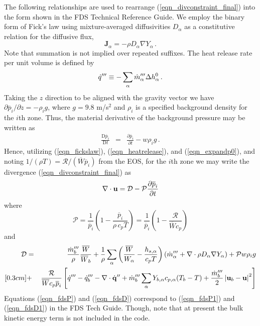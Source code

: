 The following relationships are used to rearrange (\ref{eqn_divconstraint_final}) into
the form shown in the FDS Technical Reference Guide. We employ the binary form of Fick's law using mixture-averaged diffusivities $D_\alpha$ as a constitutive relation for the diffusive flux,
\begin{equation}
\label{eqn_fickslaw}
\mathbf{J}_{\alpha} = - \rho D_\alpha \nabla Y_\alpha \,\mbox{.}
\end{equation}
Note that summation is not implied over repeated suffixes.
The heat release rate per unit volume is defined by
\begin{equation}
\label{eqn_heatrelease}
\dot{q}^{\prime\prime\prime} \equiv -\sum_\alpha \dot{m}_{\alpha}^{\prime\prime\prime} \Delta h^0_\alpha \,\mbox{.}
\end{equation}
Taking the $z$ direction to be aligned with the gravity vector we have $\partial \overline{p}_i/\partial z = -\rho_i g$,
where $g = 9.8$ m/s$^2$ and $\rho_i$ is a specified background density for the $i$th zone.
Thus, the material derivative of the background pressure may be written as
\begin{eqnarray}
\label{eqn_expandp0}
\frac{\mbox{D}\overline{p}_i}{\mbox{D}t} &=& \frac{\partial \overline{p}_i}{\partial t} - w \rho_i g \,\mbox{.}
\end{eqnarray}
Hence, utilizing (\ref{eqn_fickslaw}), (\ref{eqn_heatrelease}), and (\ref{eqn_expandp0}), and noting $1/(\rho T) = \mathcal{R}/(\overline{W} \overline{p}_i)$ from the EOS,
for the $i$th zone we may write the divergence (\ref{eqn_divconstraint_final}) as
\begin{equation}
\label{eqn_fds_divcontraint}
\nabla\cdot \mathbf{u} = \mathcal{D} - \mathcal{P} \frac{\partial \overline{p}_i}{\partial t}
\end{equation}
where
\begin{equation}
\label{eqn_fdsP}
\mathcal{P} = \frac{1}{\overline{p}_i}\left( 1 - \frac{\overline{p}_i}{\rho \,c_p T} \right) = \frac{1}{\overline{p}_i}\left( 1 - \frac{\mathcal{R}}{\overline{W} c_p}  \right)
\end{equation}
and
\begin{eqnarray}
\label{eqn_fdsD}
\mathcal{D} &=& \frac{\dot{m}_b^{\prime\prime\prime}}{\rho}\frac{\overline{W}}{\overline{W}_b} +
                \frac{1}{\rho}\sum_\alpha \left( \frac{\overline{W}}{W_\alpha} - \frac{h_{s,\alpha}}{c_p T} \right) \left( \dot{m}_{\alpha}^{\prime\prime\prime} + \nabla\cdot \rho D_\alpha \nabla Y_\alpha \right) +
                \mathcal{P} w \rho_i g \nonumber  \\ [0.3cm]
&+& \frac{\mathcal{R}}{\overline{W} c_p \overline{p}_i} \left[ \dot{q}^{\prime\prime\prime} - \dot{q}_b''' - \nabla\cdot \dot{\mathbf{q}}^{\prime\prime} + 
                \dot{m}_{b}^{{\prime\prime\prime}} \sum_\alpha Y_{b,\alpha} c_{p,\alpha}(T_b-T) +
                \frac{\dot{m}_{b}^{{\prime\prime\prime}}}{2}\left|\mathbf{u}_b-\mathbf{u}\right|^2  \right]
\end{eqnarray}
Equations (\ref{eqn_fdsP}) and (\ref{eqn_fdsD}) correspond to (\ref{eqn_fdsP1}) and (\ref{eqn_fdsD1}) in the FDS Tech Guide.  Though, note that at present the bulk kinetic energy term is not included in the code.

